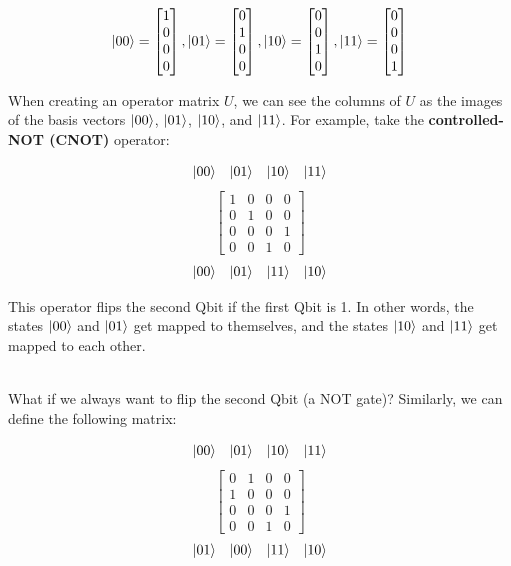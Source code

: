\documentclass[12pt]{article}
\begin{document}
\[ \ket{00} = \begin{bmatrix} 1 \\ 0 \\ 0 \\ 0 \end{bmatrix} , \ket{01} = \begin{bmatrix} 0 \\ 1 \\ 0 \\ 0 \end{bmatrix} , \ket{10} = \begin{bmatrix} 0 \\ 0 \\ 1 \\ 0 \end{bmatrix} , \ket{11} = \begin{bmatrix} 0 \\ 0 \\ 0 \\ 1 \end{bmatrix} \]

\noindent
When creating an operator matrix $U$, we can see the columns of $U$ as the images of the basis vectors $\ket{00}$, $\ket{01}$, $\ket{10}$, and $\ket{11}$.
For example, take the \textbf{controlled-NOT (CNOT)} operator:

\[ \begin{matrix}
    \ket{00} & \ket{01} & \ket{10} & \ket{11}
\end{matrix} \]
\[ \begin{bmatrix}
    1 & 0 & 0 & 0 \\
    0 & 1 & 0 & 0 \\
    0 & 0 & 0 & 1 \\
    0 & 0 & 1 & 0
\end{bmatrix} \]
\[ \begin{matrix}
    \ket{00} & \ket{01} & \ket{11} & \ket{10}
\end{matrix} \]

\noindent
This operator flips the second Qbit if the first Qbit is 1.
In other words, the states $\ket{00}$ and $\ket{01}$ get mapped to themselves, and the states $\ket{10}$ and $\ket{11}$ get mapped to each other.

\noindent
\\
What if we always want to flip the second Qbit (a NOT gate)?
Similarly, we can define the following matrix:

\[ \begin{matrix}
    \ket{00} & \ket{01} & \ket{10} & \ket{11}
\end{matrix} \]
\[ \begin{bmatrix}
    0 & 1 & 0 & 0 \\
    1 & 0 & 0 & 0 \\
    0 & 0 & 0 & 1 \\
    0 & 0 & 1 & 0
\end{bmatrix} \]
\[ \begin{matrix}
    \ket{01} & \ket{00} & \ket{11} & \ket{10}
\end{matrix} \]
\end{document}

